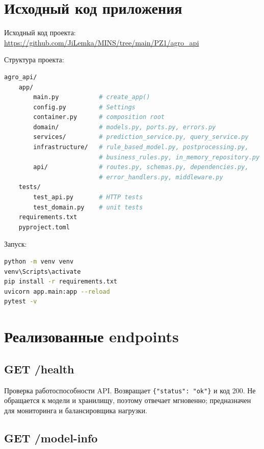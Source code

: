 \documentclass[12pt,a4paper]{article}
\begin{document}
\section{Исходный код приложения}

Исходный код проекта: \url{https://github.com/JiLemka/MINS/tree/main/PZ1/agro_api}

Структура проекта:

\begin{lstlisting}[language=bash]
agro_api/
    app/
        main.py           # create_app()
        config.py         # Settings
        container.py      # composition root
        domain/           # models.py, ports.py, errors.py
        services/         # prediction_service.py, query_service.py
        infrastructure/   # rule_based_model.py, postprocessing.py,
                          # business_rules.py, in_memory_repository.py
        api/              # routes.py, schemas.py, dependencies.py,
                          # error_handlers.py, middleware.py
    tests/
        test_api.py       # HTTP tests
        test_domain.py    # unit tests
    requirements.txt
    pyproject.toml
\end{lstlisting}

Запуск:

\begin{lstlisting}[language=bash]
python -m venv venv
venv\Scripts\activate
pip install -r requirements.txt
uvicorn app.main:app --reload
pytest -v
\end{lstlisting}

\section{Реализованные endpoints}

\subsection{GET /health}

Проверка работоспособности API. Возвращает \verb|{"status": "ok"}| и код 200. Не обращается к модели и хранилищу, поэтому отвечает мгновенно; предназначен для мониторинга и балансировщика нагрузки.

\subsection{GET /model-info}
\end{document}
